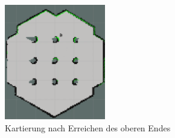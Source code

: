 {{\begin{figure}[H]
\begin{minipage}{0.5\textwidth}
				\centering
				\includegraphics[height=5cm]{Bilder/mapping_smpl_4.png}
				\caption{Kartierung nach Erreichen des oberen Endes}
				\label{pic:mapping_smpl_4}	
			\end{minipage}
		\end{figure}
	}
}